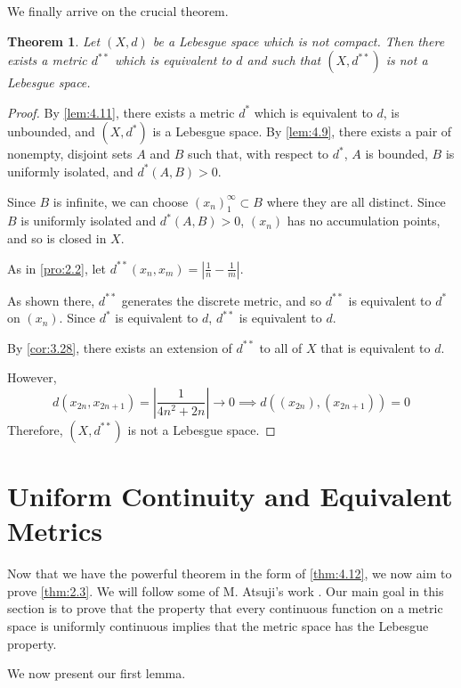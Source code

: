 \documentclass[openany, amssymb, psamsfonts]{amsart}
\let\fullref\autoref
\newtheorem{thm}{Theorem}[section]
\theoremstyle{definition}
\numberwithin{equation}{section}
\begin{document}
We finally arrive on the crucial theorem.
\begin{thm}\label{thm:4.12}
  Let $(X,d)$ be a Lebesgue space which is not compact. Then there exists a metric $d^{\ast\ast}$ which is equivalent to $d$ and such that $(X, d^{\ast \ast})$ is not a Lebesgue space.
\end{thm}
\begin{proof}
  By \fullref{lem:4.11}, there exists a metric $d^\ast$ which is equivalent to $d$, is unbounded, and $(X, d^\ast)$ is a Lebesgue space. By \fullref{lem:4.9}, there exists a pair of nonempty, disjoint sets $A$ and $B$ such that, with respect to $d^\ast$, $A$ is bounded, $B$ is uniformly isolated, and $d^\ast(A,B) > 0$. 

  Since $B$ is infinite, we can choose $(x_n)_1^\infty \subset B$ where they are all distinct. Since $B$ is uniformly isolated and $d^\ast(A,B) > 0$, $(x_n)$ has no accumulation points, and so is closed in $X$. 

  As in \fullref{pro:2.2}, let $d^{\ast \ast}(x_n, x_m) = \left| \frac1{n} - \frac1{m}\right|$.
  
  As shown there, $d^{\ast \ast}$ generates the discrete metric, and so $d^{\ast \ast}$ is equivalent to $d^\ast$ on $(x_n)$. Since $d^\ast$ is equivalent to $d$, $d^{\ast \ast}$ is equivalent to $d$. 

  By \fullref{cor:3.28}, there exists an extension of $d^{\ast \ast}$ to all of $X$ that is equivalent to $d$. 

  However, $$d(x_{2n}, x_{2n+1}) = \left|\displaystyle\frac{1}{4n^2 + 2n}\right| \to 0 \implies d((x_{2n}), (x_{2n+1}))= 0$$ Therefore, $(X,d^{\ast\ast})$ is not a Lebesgue space.  
\end{proof}
\section{Uniform Continuity and Equivalent Metrics}
Now that we have the powerful theorem in the form of \fullref{thm:4.12}, we now aim to prove \fullref{thm:2.3}. We will follow some of M. Atsuji's work \cite{atsuji}. Our main goal in this section is to prove that the property that every continuous function on a metric space is uniformly continuous implies that the metric space has the Lebesgue property. 

We now present our first lemma. 
\end{document}
